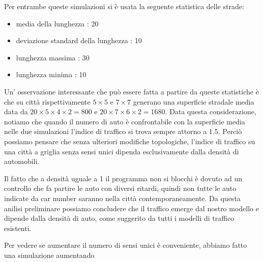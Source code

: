 \documentclass[main.tex]{subfiles}
\begin{document}
    Per entrambe queste simulazioni si è usata la seguente statistica delle strade:
    \begin{itemize}
        \item media della lunghezza : 20
        \item deviazione standard della lunghezza : 10
        \item lunghezza massima : 30
        \item lunghezza minima : 10
    \end{itemize}

    Un' osservazione interessante che può essere fatta a partire da queste statistiche è che su città rispettivamente
    $5 \times 5$ e $7 \times 7$ generano una superficie stradale media data da $20 \times 5 \times 4 \times 2 = 800$ e
    $20 \times 7 \times 6 \times 2 = 1680$. Data questa considerazione, notiamo che quando il numero di auto è confrontabile con 
    la superficie media nelle due simulazioni l'indice di traffico si trova sempre attorno a 1.5.
    Perciò possiamo pensare che senza ulteriori modifiche topologiche, l'indice di traffico su una città a griglia
    senza sensi unici dipenda esclusivamente dalla densità di automobili.

    Il fatto che a densità uguale a 1 il programma non si blocchi è dovuto ad un controllo che fa partire le auto con diversi ritardi,
    quindi non tutte le auto indicate da car number saranno nella città contemporaneamente.
    Da questa anilisi preliminare possiamo concludere che il traffico emerge dal nostro modello e dipende dalla densità di auto,
    come suggerito da tutti i modelli di traffico esistenti.

    Per vedere se aumentare il numero di sensi unici è conveniente, abbiamo fatto una simulazione aumentando 

    
\end{document}
